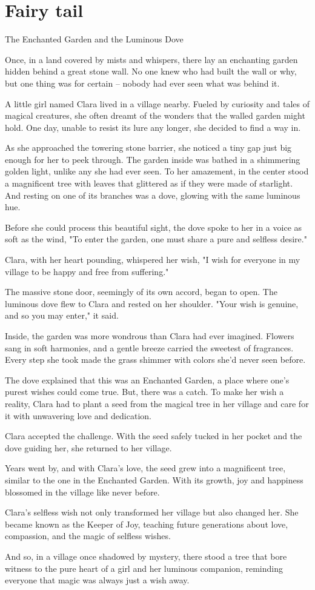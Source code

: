 \documentclass[10pt, a4paper, titlepage]{article}
\begin{document}
\section{Fairy tail}
The Enchanted Garden and the Luminous Dove

Once, in a land covered by mists and whispers, there lay an enchanting garden hidden behind a great stone wall. No one knew who had built the wall or why, but one thing was for certain – nobody had ever seen what was behind it.

A little girl named Clara lived in a village nearby. Fueled by curiosity and tales of magical creatures, she often dreamt of the wonders that the walled garden might hold. One day, unable to resist its lure any longer, she decided to find a way in.

As she approached the towering stone barrier, she noticed a tiny gap just big enough for her to peek through. The garden inside was bathed in a shimmering golden light, unlike any she had ever seen. To her amazement, in the center stood a magnificent tree with leaves that glittered as if they were made of starlight. And resting on one of its branches was a dove, glowing with the same luminous hue.

Before she could process this beautiful sight, the dove spoke to her in a voice as soft as the wind, "To enter the garden, one must share a pure and selfless desire."

Clara, with her heart pounding, whispered her wish, "I wish for everyone in my village to be happy and free from suffering."

The massive stone door, seemingly of its own accord, began to open. The luminous dove flew to Clara and rested on her shoulder. "Your wish is genuine, and so you may enter," it said.

Inside, the garden was more wondrous than Clara had ever imagined. Flowers sang in soft harmonies, and a gentle breeze carried the sweetest of fragrances. Every step she took made the grass shimmer with colors she'd never seen before.

The dove explained that this was an Enchanted Garden, a place where one’s purest wishes could come true. But, there was a catch. To make her wish a reality, Clara had to plant a seed from the magical tree in her village and care for it with unwavering love and dedication.

Clara accepted the challenge. With the seed safely tucked in her pocket and the dove guiding her, she returned to her village.

Years went by, and with Clara's love, the seed grew into a magnificent tree, similar to the one in the Enchanted Garden. With its growth, joy and happiness blossomed in the village like never before.

Clara's selfless wish not only transformed her village but also changed her. She became known as the Keeper of Joy, teaching future generations about love, compassion, and the magic of selfless wishes.

And so, in a village once shadowed by mystery, there stood a tree that bore witness to the pure heart of a girl and her luminous companion, reminding everyone that magic was always just a wish away.
\end{document}
